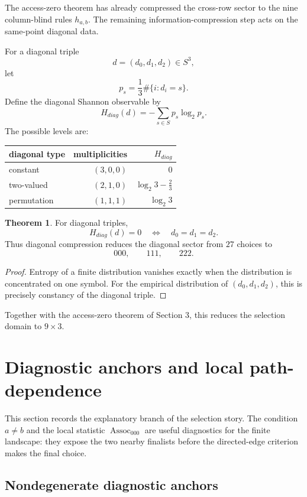 \documentclass[11pt]{article}
\theoremstyle{definition}
\newtheorem{theorem}{Theorem}[section]
\begin{document}
The access-zero theorem has already compressed the cross-row sector to
the nine column-blind rules \(h_{a,b}\). The remaining
information-compression step acts on the same-point diagonal data.

For a diagonal triple \[
d=(d_0,d_1,d_2)\in S^3,
\] let \[
p_s=\frac13\#\{i:d_i=s\}.
\] Define the diagonal Shannon observable by \[
\boxed{
H_{diag}(d)=-\sum_{s\in S}p_s\log_2 p_s.
}
\] The possible levels are:

\begin{longtable}[]{@{}lrr@{}}
\toprule\noalign{}
diagonal type & multiplicities & \(H_{diag}\) \\
\midrule\noalign{}
\endhead
\bottomrule\noalign{}
\endlastfoot
constant & \((3,0,0)\) & \(0\) \\
two-valued & \((2,1,0)\) & \(\log_2 3-\frac23\) \\
permutation & \((1,1,1)\) & \(\log_2 3\) \\
\end{longtable}

\begin{theorem}
\label{thm:9.1}
For diagonal triples, \[
H_{diag}(d)=0
\quad\Longleftrightarrow\quad
 d_0=d_1=d_2.
\] Thus diagonal compression reduces the diagonal sector from \(27\)
choices to \[
000,
\qquad 111,
\qquad 222.
\]
\end{theorem}

\begin{proof}
Entropy of a finite distribution vanishes exactly when
the distribution is concentrated on one symbol. For the empirical
distribution of \((d_0,d_1,d_2)\), this is precisely constancy of the
diagonal triple.
\end{proof}

Together with the access-zero theorem of Section 3, this reduces the
selection domain to \(9\times3\).

\section{Diagnostic anchors and local
path-dependence}\label{anchors-and-local-path-dependence}

This section records the explanatory branch of the selection story.  The
condition \(a\ne b\) and the local statistic \(\operatorname{Assoc}_{000}\)
are useful diagnostics for the finite landscape: they expose the two
nearby finalists before the directed-edge criterion makes the final choice.

\subsection{Nondegenerate diagnostic anchors}\label{nondegenerate-anchors}
\end{document}

